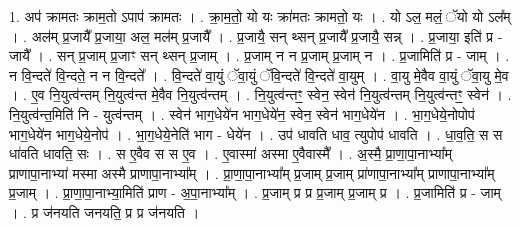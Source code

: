 \documentclass[17pt]{extarticle}
\begin{document}
1. अप॑ क्रामतः क्राम॒तो ऽपाप॑ क्रामतः । . क्रा॒म॒तो॒ यो यः क्रा॑मतः क्रामतो॒ यः । . यो ऽल॒ मलं॒ ॅयो यो ऽल᳚म् । . अल॑म् प्र॒जायै᳚ प्र॒जाया॒ अल॒ मल॑म् प्र॒जायै᳚ । . प्र॒जायै॒ सन् थ्सन् प्र॒जायै᳚ प्र॒जायै॒ सन्न् । . प्र॒जाया॒ इति॑ प्र - जायै᳚ । . सन् प्र॒जाम् प्र॒जाꣳ सन् थ्सन् प्र॒जाम् । . प्र॒जाम् न न प्र॒जाम् प्र॒जाम् न । . प्र॒जामिति॑ प्र - जाम् । . न वि॒न्दते॑ वि॒न्दते॒ न न वि॒न्दते᳚ । . वि॒न्दते॑ वा॒युं ॅवा॒युं ॅवि॒न्दते॑ वि॒न्दते॑ वा॒युम् । . वा॒यु मे॒वैव वा॒युं ॅवा॒यु मे॒व । . ए॒व नि॒युत्व॑न्तम् नि॒युत्व॑न्त मे॒वैव नि॒युत्व॑न्तम् । . नि॒युत्व॑न्तꣳ॒॒ स्वेन॒ स्वेन॑ नि॒युत्व॑न्तम् नि॒युत्व॑न्तꣳ॒॒ स्वेन॑ । . नि॒युत्व॑न्त॒मिति॑ नि - युत्व॑न्तम् । . स्वेन॑ भाग॒धेये॑न भाग॒धेये॑न॒ स्वेन॒ स्वेन॑ भाग॒धेये॑न । . भा॒ग॒धेये॒नोपोप॑ भाग॒धेये॑न भाग॒धेये॒नोप॑ । . भा॒ग॒धेये॒नेति॑ भाग - धेये॑न । . उप॑ धावति धाव॒ त्युपोप॑ धावति । . धा॒व॒ति॒ स स धा॑वति धावति॒ सः । . स ए॒वैव स स ए॒व । . ए॒वास्मा॑ अस्मा ए॒वैवास्मै᳚ । . अ॒स्मै॒ प्रा॒णा॒पा॒नाभ्या᳚म् प्राणापा॒नाभ्या॑ मस्मा अस्मै प्राणापा॒नाभ्या᳚म् । . प्रा॒णा॒पा॒नाभ्या᳚म् प्र॒जाम् प्र॒जाम् प्रा॑णापा॒नाभ्या᳚म् प्राणापा॒नाभ्या᳚म् प्र॒जाम् । . प्रा॒णा॒पा॒नाभ्या॒मिति॑ प्राण - अ॒पा॒नाभ्या᳚म् । . प्र॒जाम् प्र प्र प्र॒जाम् प्र॒जाम् प्र । . प्र॒जामिति॑ प्र - जाम् । . प्र ज॑नयति जनयति॒ प्र प्र ज॑नयति । \newline
\end{document}
